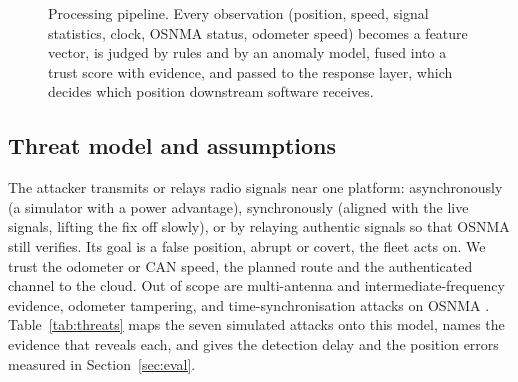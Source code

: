 \documentclass[conference]{IEEEtran}
\begin{document}
\begin{figure}[t]
\centering
{}
\caption{Processing pipeline. Every observation (position, speed, signal statistics, clock, OSNMA status, odometer speed) becomes a feature vector, is judged by rules and by an anomaly model, fused into a trust score with evidence, and passed to the response layer, which decides which position downstream software receives. }
\label{fig:pipeline}
\end{figure}

\subsection{Threat model and assumptions}
The attacker transmits or relays radio signals near one platform: asynchronously (a simulator with a power advantage), synchronously (aligned with the live signals, lifting the fix off slowly), or by relaying authentic signals so that OSNMA still verifies. Its goal is a false position, abrupt or covert, the fleet acts on. We trust the odometer or CAN speed, the planned route and the authenticated channel to the cloud. Out of scope are multi-antenna and intermediate-frequency evidence, odometer tampering, and time-synchronisation attacks on OSNMA \cite{wang2025}. Table~\ref{tab:threats} maps the seven simulated attacks onto this model, names the evidence that reveals each, and gives the detection delay and the position errors measured in Section~\ref{sec:eval}.
\end{document}
